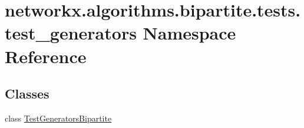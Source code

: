 \hypertarget{namespacenetworkx_1_1algorithms_1_1bipartite_1_1tests_1_1test__generators}{}\section{networkx.\+algorithms.\+bipartite.\+tests.\+test\+\_\+generators Namespace Reference}
\label{namespacenetworkx_1_1algorithms_1_1bipartite_1_1tests_1_1test__generators}
\subsection*{Classes}
\begin{DoxyCompactItemize}
\item 
class \hyperlink{classnetworkx_1_1algorithms_1_1bipartite_1_1tests_1_1test__generators_1_1TestGeneratorsBipartite}{Test\+Generators\+Bipartite}
\end{DoxyCompactItemize}
